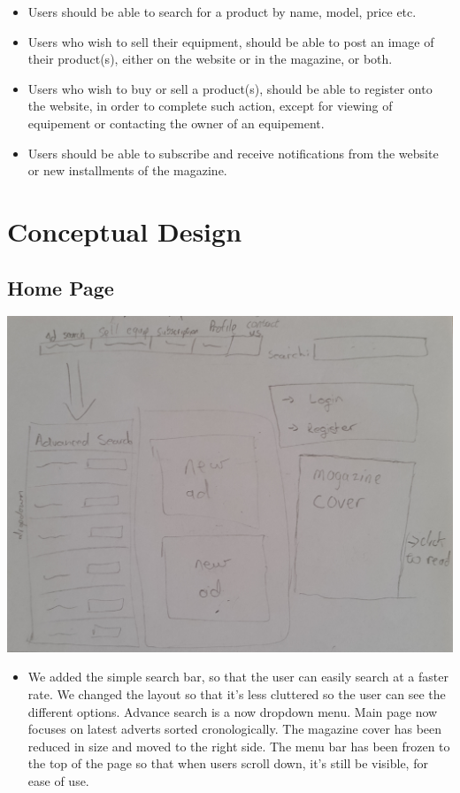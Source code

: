 \documentclass[11pt]{article}
\begin{document}
\begin{itemize}
	\item Users should be able to search for a product by name, model, price etc.
	\item Users who wish to sell their equipment, should be able to post an image of their product(s), either on the website or in the magazine, or both.
	\item Users who wish to buy or sell a product(s), should be able to register onto the website, in order to complete such action, except for viewing of equipement or contacting the owner of an equipement.
	\item Users should be able to subscribe and receive notifications from the website or new installments of the magazine.
\end{itemize}

\section{Conceptual Design}

	\subsection{Home Page}
	\includegraphics[width=\textwidth]{../Images/HomePage.jpg} \\
	
	\begin{itemize}
	\item We added the simple search bar, so that the user can easily search at a faster rate. We changed the layout so that it's less cluttered so the user can see the different options. Advance search is a now dropdown menu. Main page now focuses on latest adverts sorted cronologically. The magazine cover has been reduced in size and moved to the right side. The menu bar has been frozen to the top of the page so that when users scroll down, it's still be visible, for ease of use. \newpage
	\end{itemize} 
	
\end{document}

